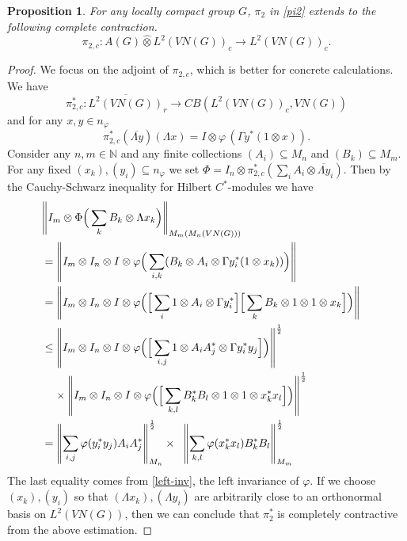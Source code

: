 \documentclass[10pt]{amsart}
\newtheorem{prop}[thm]{Proposition}
\numberwithin{thm}{section}
\numberwithin{equation}{section}
\begin{document}
	\begin{prop}\label{prop-sigma2}
	For any locally compact group $G$, $\pi_2$ in \eqref{pi2} extends to the following complete contraction.
		$$\pi_{2,c} : A(G) {\widehat{\otimes}} L^2(VN(G))_c \rightarrow L^2(VN(G))_c.$$
	\end{prop}
\begin{proof}
We focus on the adjoint of $\pi_{2,c}$, which is better for concrete calculations. We have
	$$\pi^*_{2,c} : \overline{L^2(VN(G))}_r \rightarrow CB(L^2(VN(G))_c, VN(G))$$
and for any $x, y\in n_\varphi$
	\begin{equation}\label{sigma2}
	\pi^*_{2,c}(\overline{\Lambda y}) (\Lambda x) = I\otimes \varphi \,(\Gamma y^* (1\otimes x)).
	\end{equation}
Consider any $n,m \in {\mathbb{N}}$ and any finite collections $(A_i) \subseteq M_n$ and $(B_k) \subseteq M_m$.
For any fixed $(x_k), (y_i) \subseteq n_\varphi$ we set $\Phi = I_n \otimes \pi^*_{2,c} (\sum_i A_i \otimes \overline{\Lambda y}_i)$.
Then by the Cauchy-Schwarz inequality for Hilbert $C^*$-modules we have
	\begin{align*}
	\lefteqn{{\left\Vert{I_m \otimes \Phi \Big(\sum_k B_k \otimes \Lambda x_k \Big)}\right\Vert}_{M_m(M_n(VN(G)))}}\\
	& = {\left\Vert{I_m \otimes I_n \otimes I \otimes \varphi \Big( \sum_{i,k} (B_k \otimes A_i \otimes \Gamma y^*_i (1\otimes x_k)) \Big)}\right\Vert}\\
	& = {\left\Vert{I_m \otimes I_n \otimes I \otimes \varphi
	\Big( \Big[\sum_i 1\otimes A_i \otimes \Gamma y^*_i \Big] \Big[\sum_k B_k \otimes 1 \otimes 1\otimes x_k \Big] \Big)}\right\Vert}\\
	& \le {\left\Vert{I_m \otimes I_n \otimes I \otimes \varphi
	\Big( \Big[\sum_{i,j} 1\otimes A_i A^*_j \otimes \Gamma y^*_i y_j \Big] \Big)}\right\Vert}^{\frac{1}{2}}\\
	& \;\;\;\; \times {\left\Vert{I_m \otimes I_n \otimes I \otimes \varphi
	\Big( \Big[\sum_{k,l} B^*_k B_l \otimes 1 \otimes 1\otimes x^*_k x_l \Big] \Big)}\right\Vert}^{\frac{1}{2}}\\
	& = {\left\Vert{\sum_{i,j} \varphi(y^*_i y_j) A_i A^*_j}\right\Vert}^{\frac{1}{2}}_{M_n}
	\times \;\;{\left\Vert{\sum_{k,l} \varphi(x^*_k x_l) B^*_k B_l}\right\Vert}^{\frac{1}{2}}_{M_m}
	\end{align*}
The last equality comes from \eqref{left-inv}, the left invariance of $\varphi$.
If we choose $(x_k), (y_i)$ so that $(\Lambda x_k), (\Lambda y_i)$ are arbitrarily close to an orthonormal basis on $L^2(VN(G))$,
then we can conclude that $\pi^*_2$ is completely contractive from the above estimation.

\end{proof}
\end{document}
